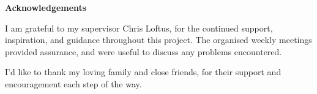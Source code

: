 \thispagestyle{empty}


\begin{center}
    {\LARGE\bf Acknowledgements}
\end{center}

I am grateful to my supervisor Chris Loftus, for the continued support, inspiration, and guidance throughout this project. The organised weekly meetings provided assurance, and were useful to discuss any problems encountered.

I'd like to thank my loving family and close friends, for their support and encouragement each step of the way. 

